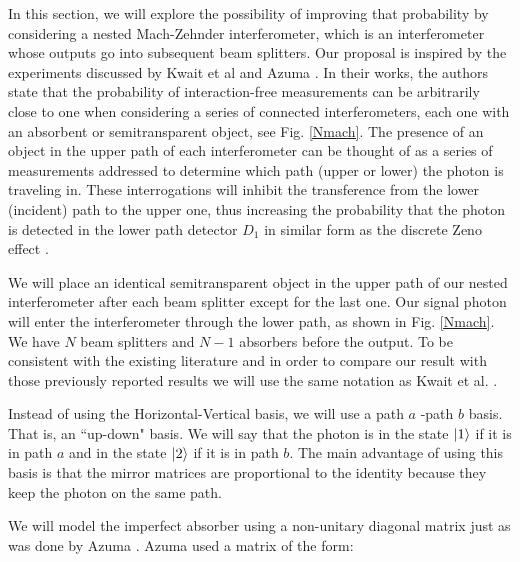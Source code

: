 \documentclass[12pt]{book}
\begin{document}
In this section, we will explore the possibility of improving that probability by considering a nested Mach-Zehnder interferometer, which is an interferometer whose outputs go into subsequent beam splitters. Our proposal is inspired by the experiments discussed by Kwait et al \cite{5} and Azuma \cite{Azuma}. In their works, the authors state that the probability of interaction-free measurements can be arbitrarily close to one when considering a series of connected interferometers, each one with an absorbent or semitransparent object, see Fig. \ref{Nmach}. The presence of an object in the upper path of each interferometer can be thought of as a series of measurements addressed to determine which path (upper or lower) the photon is traveling in. These interrogations will inhibit the transference from the lower (incident) path to the upper one, thus increasing the probability that the photon is detected in the lower path detector $D_{1}$ in similar form as the discrete Zeno effect \cite{5}.

  We will place an identical semitransparent object in the upper path of our nested interferometer after each beam splitter except for the last one. Our signal photon will enter the interferometer through the lower path, as shown in Fig. \ref{Nmach}. We have $N$ beam splitters and $N-1$ absorbers before the output. To be consistent with the existing literature and in order to compare our result with those previously reported results we will use the same notation as Kwait et al. \cite{5}.
 
 
Instead of using the Horizontal-Vertical basis, we will use a path $a$ -path $b$ basis. That is, an ``up-down" basis. We will say that the photon is in the state $\ket{1}$ if it is in path $a$ and in the state $\ket{2}$ if it is in path $b$. The main advantage of using this basis is that the mirror matrices are proportional to the identity because they keep the photon on the same path.
 

 
 
  We will model the imperfect absorber using a non-unitary diagonal matrix just as was done by  Azuma \cite{Azuma}. Azuma used a matrix of the form:
 
\end{document}
